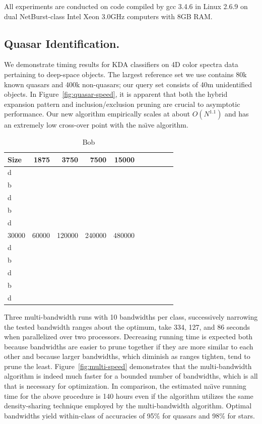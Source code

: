 \documentclass[twoside,leqno,twocolumn]{article}
\begin{document}
All experiments are conducted on code compiled by gcc 3.4.6 in Linux
2.6.9 on dual NetBurst-class Intel Xeon 3.0GHz computers with 8GB RAM.

\subsection{Quasar Identification.}
We demonstrate timing results for KDA classifiers on 4D color spectra
data pertaining to deep-space objects.  The largest reference set we
use contains 80k known quasars and 400k non-quasars; our query set
consists of 40m unidentified objects.  In
Figure~\ref{fig:quasar-speed}, it is apparent that both the hybrid
expansion pattern and inclusion/exclusion pruning are crucial to
asymptotic performance.  Our new algorithm empirically scales at about
$O(N^{1.1})$ and has an extremely low cross-over point with the
na\"{\i}ve algorithm.

\begin{table}[b]
  \begin{center}\begin{tabular}{|l|r|r|r|r|r|r|r|r|r|}
    \hline
    \hline
    Size & 1875 & 3750 & 7500 & 15000 \\
    \hline
    \hline
    d \\
    \hline
    b \\
    \hline
    d \\
    \hline
    b \\
    \hline
    d \\
    \hline
    \hline
    30000 & 60000 & 120000 & 240000 & 480000 \\
    \hline
    \hline
    d \\
    \hline
    b \\
    \hline
    d \\
    \hline
    b \\
    \hline
    d \\
    \hline
    \hline
  \end{tabular}\end{center}\vspace{}
  \caption{Bob}
\end{table}
\fi

Three multi-bandwidth runs with 10 bandwidths per class, successively
narrowing the tested bandwidth ranges about the optimum, take 334,
127, and 86 seconds when parallelized over two processors.  Decreasing
running time is expected both because bandwidths are easier to prune
together if they are more similar to each other and because larger
bandwidths, which diminish as ranges tighten, tend to prune the least.
Figure~\ref{fig:multi-speed} demonstrates that the multi-bandwidth
algorithm is indeed much faster for a bounded number of bandwidths,
which is all that is necessary for optimization.  In comparison, the
estimated na\"{\i}ve running time for the above procedure is 140 hours
even if the algorithm utilizes the same density-sharing technique
employed by the multi-bandwidth algorithm.  Optimal bandwidths yield
within-class of accuracies of 95\% for quasars and 98\% for stars.
\end{document}
